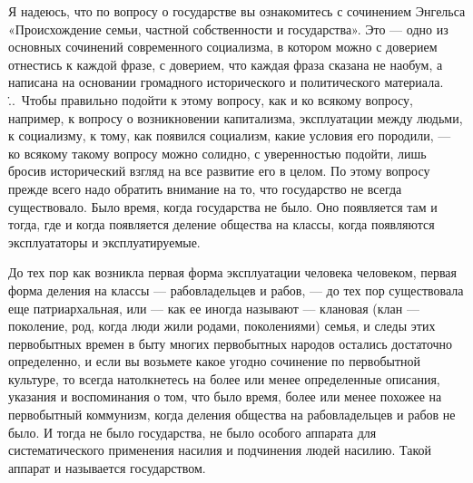 \documentclass[12pt]{article}
\newcommand{\parnum}{(\arabic{parcount})}
\newcounter{parcount}
\newenvironment{parnumbers}{%
  \par%
  \everypar{\noindent \stepcounter{parcount}\marginpar[]{\parnum}}%
}{}
\begin{document}
\begin{parnumbers}
Я надеюсь, что по вопросу о государстве вы ознакомитесь с сочинением Энгельса «Происхождение семьи, частной собственности и государства». Это — одно из основных сочинений современного социализма, в котором можно с доверием отнестись к каждой фразе, с доверием, что каждая фраза сказана не наобум, а написана на основании громадного исторического и политического материала. \...\ Чтобы правильно подойти к этому вопросу, как и ко всякому вопросу, например, к вопросу о возникновении капитализма, эксплуатации между людьми, к социализму, к тому, как появился социализм, какие условия его породили, — ко всякому такому вопросу можно солидно, с уверенностью подойти, лишь бросив исторический взгляд на все развитие его в целом. По этому вопросу прежде всего надо обратить внимание на то, что государство не всегда существовало. Было время, когда государства не было. Оно появляется там и тогда, где и когда появляется деление общества на классы, когда появляются эксплуататоры и эксплуатируемые.

До тех пор как возникла первая форма эксплуатации человека человеком, первая форма деления на классы — рабовладельцев и рабов, — до тех пор существовала еще патриархальная, или — как ее иногда называют — клановая (клан — поколение, род, когда люди жили родами, поколениями) семья, и следы этих первобытных времен в быту многих первобытных народов остались достаточно определенно, и если вы возьмете какое угодно сочинение по первобытной культуре, то всегда натолкнетесь на более или менее определенные описания, указания и воспоминания о том, что было время, более или менее похожее на первобытный коммунизм, когда деления общества на рабовладельцев и рабов не было. И тогда не было государства, не было особого аппарата для систематического применения насилия и подчинения людей насилию. Такой аппарат и называется государством.


\end{parnumbers}
\end{document}
